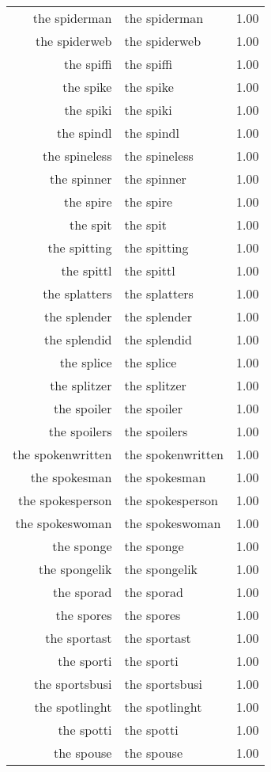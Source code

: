 \begin{table}[ht]
\begin{tabular}{rlr}
  the spiderman & the spiderman & 1.00 \\ 
  the spiderweb & the spiderweb & 1.00 \\ 
  the spiffi & the spiffi & 1.00 \\ 
  the spike & the spike & 1.00 \\ 
  the spiki & the spiki & 1.00 \\ 
  the spindl & the spindl & 1.00 \\ 
  the spineless & the spineless & 1.00 \\ 
  the spinner & the spinner & 1.00 \\ 
  the spire & the spire & 1.00 \\ 
  the spit & the spit & 1.00 \\ 
  the spitting & the spitting & 1.00 \\ 
  the spittl & the spittl & 1.00 \\ 
  the splatters & the splatters & 1.00 \\ 
  the splender & the splender & 1.00 \\ 
  the splendid & the splendid & 1.00 \\ 
  the splice & the splice & 1.00 \\ 
  the splitzer & the splitzer & 1.00 \\ 
  the spoiler & the spoiler & 1.00 \\ 
  the spoilers & the spoilers & 1.00 \\ 
  the spokenwritten & the spokenwritten & 1.00 \\ 
  the spokesman & the spokesman & 1.00 \\ 
  the spokesperson & the spokesperson & 1.00 \\ 
  the spokeswoman & the spokeswoman & 1.00 \\ 
  the sponge & the sponge & 1.00 \\ 
  the spongelik & the spongelik & 1.00 \\ 
  the sporad & the sporad & 1.00 \\ 
  the spores & the spores & 1.00 \\ 
  the sportast & the sportast & 1.00 \\ 
  the sporti & the sporti & 1.00 \\ 
  the sportsbusi & the sportsbusi & 1.00 \\ 
  the spotlinght & the spotlinght & 1.00 \\ 
  the spotti & the spotti & 1.00 \\ 
  the spouse & the spouse & 1.00 \\ 

\end{tabular}
\end{table}
